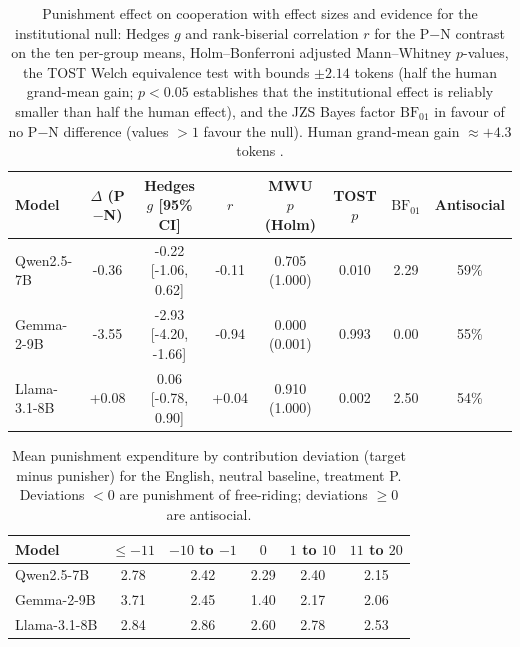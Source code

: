 \begin{table}[t]\centering
\caption{Punishment effect on cooperation with effect sizes and evidence for the institutional null: Hedges $g$ and rank-biserial correlation $r$ for the P$-$N contrast on the ten per-group means, Holm--Bonferroni adjusted Mann--Whitney $p$-values, the TOST Welch equivalence test with bounds $\pm2.14$ tokens (half the human grand-mean gain; $p<0.05$ establishes that the institutional effect is reliably smaller than half the human effect), and the JZS Bayes factor $\mathrm{BF}_{01}$ in favour of no P$-$N difference (values $>1$ favour the null). Human grand-mean gain $\approx+4.3$ tokens \cite{herrmann2008antisocial}.}
\label{tab:si_punish}
\begin{tabular}{lccccccc}\toprule
Model & $\Delta$ (P$-$N) & Hedges $g$ [95\% CI] & $r$ & MWU $p$ (Holm) & TOST $p$ & $\mathrm{BF}_{01}$ & Antisocial \\\midrule
Qwen2.5-7B & -0.36 & -0.22 [-1.06, 0.62] & -0.11 & 0.705 (1.000) & 0.010 & 2.29 & 59\% \\
Gemma-2-9B & -3.55 & -2.93 [-4.20, -1.66] & -0.94 & 0.000 (0.001) & 0.993 & 0.00 & 55\% \\
Llama-3.1-8B & +0.08 & 0.06 [-0.78, 0.90] & +0.04 & 0.910 (1.000) & 0.002 & 2.50 & 54\% \\
\bottomrule\end{tabular}\end{table}

\begin{table}[t]\centering
\caption{Mean punishment expenditure by contribution deviation (target minus punisher) for the English, neutral baseline, treatment P. Deviations $<0$ are punishment of free-riding; deviations $\geq 0$ are antisocial.}
\label{tab:si_deviation}
\begin{tabular}{lccccc}\toprule
Model & $\leq-11$ & $-10$ to $-1$ & $0$ & $1$ to $10$ & $11$ to $20$ \\\midrule
Qwen2.5-7B & 2.78 & 2.42 & 2.29 & 2.40 & 2.15 \\
Gemma-2-9B & 3.71 & 2.45 & 1.40 & 2.17 & 2.06 \\
Llama-3.1-8B & 2.84 & 2.86 & 2.60 & 2.78 & 2.53 \\
\bottomrule\end{tabular}\end{table}

